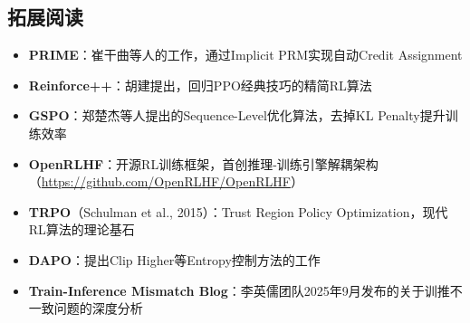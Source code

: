 \subsection{拓展阅读}

\begin{itemize}
    \item \textbf{PRIME}：崔干曲等人的工作，通过Implicit PRM实现自动Credit Assignment
    \item \textbf{Reinforce++}：胡建提出，回归PPO经典技巧的精简RL算法
    \item \textbf{GSPO}：郑楚杰等人提出的Sequence-Level优化算法，去掉KL Penalty提升训练效率
    \item \textbf{OpenRLHF}：开源RL训练框架，首创推理-训练引擎解耦架构（\url{https://github.com/OpenRLHF/OpenRLHF}）
    \item \textbf{TRPO}（Schulman et al., 2015）：Trust Region Policy Optimization，现代RL算法的理论基石
    \item \textbf{DAPO}：提出Clip Higher等Entropy控制方法的工作
    \item \textbf{Train-Inference Mismatch Blog}：李英儒团队2025年9月发布的关于训推不一致问题的深度分析
\end{itemize}



